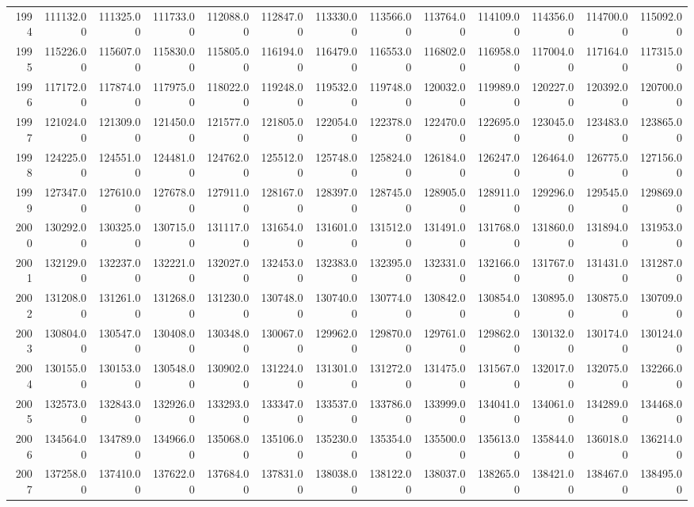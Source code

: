 \begin{longtable}{rrrrrrrrrrrrr}
  1994 & 111132.00 & 111325.00 & 111733.00 & 112088.00 & 112847.00 & 113330.00 & 113566.00 & 113764.00 & 114109.00 & 114356.00 & 114700.00 & 115092.00 \\ 
  1995 & 115226.00 & 115607.00 & 115830.00 & 115805.00 & 116194.00 & 116479.00 & 116553.00 & 116802.00 & 116958.00 & 117004.00 & 117164.00 & 117315.00 \\ 
  1996 & 117172.00 & 117874.00 & 117975.00 & 118022.00 & 119248.00 & 119532.00 & 119748.00 & 120032.00 & 119989.00 & 120227.00 & 120392.00 & 120700.00 \\ 
  1997 & 121024.00 & 121309.00 & 121450.00 & 121577.00 & 121805.00 & 122054.00 & 122378.00 & 122470.00 & 122695.00 & 123045.00 & 123483.00 & 123865.00 \\ 
  1998 & 124225.00 & 124551.00 & 124481.00 & 124762.00 & 125512.00 & 125748.00 & 125824.00 & 126184.00 & 126247.00 & 126464.00 & 126775.00 & 127156.00 \\ 
  1999 & 127347.00 & 127610.00 & 127678.00 & 127911.00 & 128167.00 & 128397.00 & 128745.00 & 128905.00 & 128911.00 & 129296.00 & 129545.00 & 129869.00 \\ 
  2000 & 130292.00 & 130325.00 & 130715.00 & 131117.00 & 131654.00 & 131601.00 & 131512.00 & 131491.00 & 131768.00 & 131860.00 & 131894.00 & 131953.00 \\ 
  2001 & 132129.00 & 132237.00 & 132221.00 & 132027.00 & 132453.00 & 132383.00 & 132395.00 & 132331.00 & 132166.00 & 131767.00 & 131431.00 & 131287.00 \\ 
  2002 & 131208.00 & 131261.00 & 131268.00 & 131230.00 & 130748.00 & 130740.00 & 130774.00 & 130842.00 & 130854.00 & 130895.00 & 130875.00 & 130709.00 \\ 
  2003 & 130804.00 & 130547.00 & 130408.00 & 130348.00 & 130067.00 & 129962.00 & 129870.00 & 129761.00 & 129862.00 & 130132.00 & 130174.00 & 130124.00 \\ 
  2004 & 130155.00 & 130153.00 & 130548.00 & 130902.00 & 131224.00 & 131301.00 & 131272.00 & 131475.00 & 131567.00 & 132017.00 & 132075.00 & 132266.00 \\ 
  2005 & 132573.00 & 132843.00 & 132926.00 & 133293.00 & 133347.00 & 133537.00 & 133786.00 & 133999.00 & 134041.00 & 134061.00 & 134289.00 & 134468.00 \\ 
  2006 & 134564.00 & 134789.00 & 134966.00 & 135068.00 & 135106.00 & 135230.00 & 135354.00 & 135500.00 & 135613.00 & 135844.00 & 136018.00 & 136214.00 \\ 
  2007 & 137258.00 & 137410.00 & 137622.00 & 137684.00 & 137831.00 & 138038.00 & 138122.00 & 138037.00 & 138265.00 & 138421.00 & 138467.00 & 138495.00 \\ 

\end{longtable}
